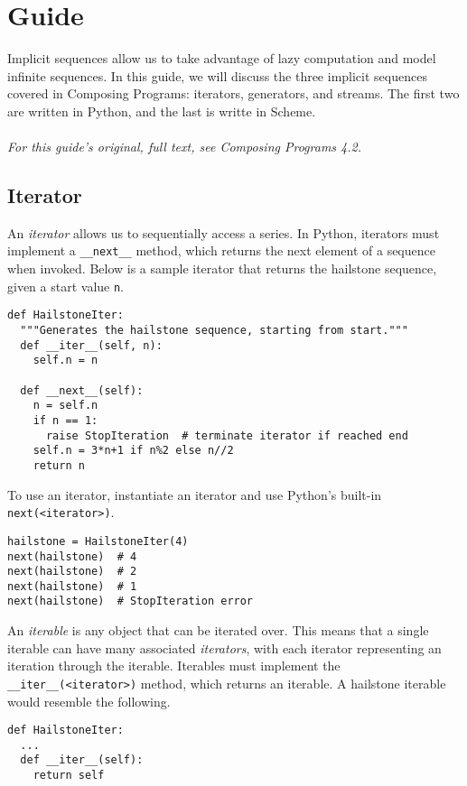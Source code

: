 \documentclass[a4paper]{book}
\begin{document}
\section{Guide}

Implicit sequences allow us to take advantage of lazy computation and model infinite sequences. In this guide, we will discuss the three implicit sequences covered in Composing Programs: iterators, generators, and streams. The first two are written in Python, and the last is writte in Scheme.
\\
\\
\textit{For this guide's original, full text, see Composing Programs 4.2.}

\subsection{Iterator}

An \textit{iterator} allows us to sequentially access a series. In Python, iterators must implement a {\tt \_\_next\_\_} method, which returns the next element of a sequence when invoked. Below is a sample iterator that returns the hailstone sequence, given a start value {\tt n}.

\begin{lstlisting}
def HailstoneIter:
  """Generates the hailstone sequence, starting from start."""
  def __iter__(self, n):
    self.n = n
        
  def __next__(self):
    n = self.n
    if n == 1:
      raise StopIteration  # terminate iterator if reached end
    self.n = 3*n+1 if n%2 else n//2
    return n
\end{lstlisting}

To use an iterator, instantiate an iterator and use Python's built-in {\tt next(<iterator>)}.

\begin{lstlisting}
hailstone = HailstoneIter(4)
next(hailstone)  # 4
next(hailstone)  # 2
next(hailstone)  # 1
next(hailstone)  # StopIteration error
\end{lstlisting}

An \textit{iterable} is any object that can be iterated over. This means that a single iterable can have many associated \textit{iterators}, with each iterator representing an iteration through the iterable. Iterables must implement the {\tt \_\_iter\_\_(<iterator>)} method, which returns an iterable. A hailstone iterable would resemble the following.

\begin{lstlisting}
def HailstoneIter:
  ...
  def __iter__(self):
    return self
\end{lstlisting}
\end{document}
